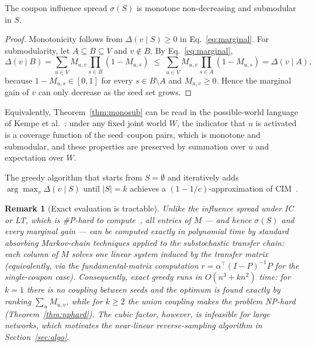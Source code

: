 \documentclass[sigconf]{acmart}
\newtheorem{remark}{Remark}[section]
\begin{document}
\begin{theorem}
\label{thm:monosub}
The coupon influence spread $\sigma(S)$ is monotone non-decreasing
and submodular in $S$.
\end{theorem}

\begin{proof}
Monotonicity follows from $\Delta(v\mid S)\ge 0$ in
Eq.~\eqref{eq:marginal}.
For submodularity, let $A\subseteq B\subseteq V$ and $v\notin B$.
By Eq.~\eqref{eq:marginal},
\[
\Delta(v\mid B)
=
\sum_{u\in V}M_{u,v}\prod_{s\in B}(1-M_{u,s})
\;\le\;
\sum_{u\in V}M_{u,v}\prod_{s\in A}(1-M_{u,s})
=
\Delta(v\mid A),
\]
because $1-M_{u,s}\in[0,1]$ for every $s\in B\setminus A$ and
$M_{u,v}\ge 0$.
Hence the marginal gain of $v$ can only decrease as the seed set
grows.
\end{proof}

Equivalently, Theorem~\ref{thm:monosub} can be read in the
possible-world language of Kempe et al.~\cite{kempe2003maximizing}:
under any fixed joint world $W$, the indicator that $u$ is activated
is a coverage function of the seed--coupon pairs, which is monotone
and submodular, and these properties are preserved by summation over
$u$ and expectation over $W$.

\begin{corollary}
\label{cor:greedy}
The greedy algorithm that starts from $S=\emptyset$ and iteratively
adds $\arg\max_{v}\Delta(v\mid S)$ until $|S|=k$ achieves a
$(1-1/e)$-approximation of CIM~\cite{nemhauser1978analysis}.
\end{corollary}

\begin{remark}[Exact evaluation is tractable]
\label{rem:tractable-eval}
Unlike the influence spread under IC or LT, which is
\#P-hard to compute~\cite{chen2010scalable}, all entries of $M$ ---
and hence $\sigma(S)$ and every marginal gain --- can be computed
\emph{exactly} in polynomial time by standard absorbing Markov-chain
techniques applied to the substochastic transfer chain: each column
of $M$ solves one linear system induced by the transfer matrix
(equivalently, via the fundamental-matrix computation
$r=\alpha^{\top}(I-P)^{-1}P$ for the single-coupon case).
Consequently, exact greedy runs in $O(n^3+kn^2)$ time: for $k=1$
there is no coupling between seeds and the optimum is found exactly
by ranking $\sum_{u}M_{u,v}$, while for $k\ge 2$ the union coupling
makes the problem NP-hard (Theorem~\ref{thm:nphard}).
The cubic factor, however, is infeasible for large networks, which
motivates the near-linear reverse-sampling algorithm in
Section~\ref{sec:algo}.
\end{remark}
\end{document}
